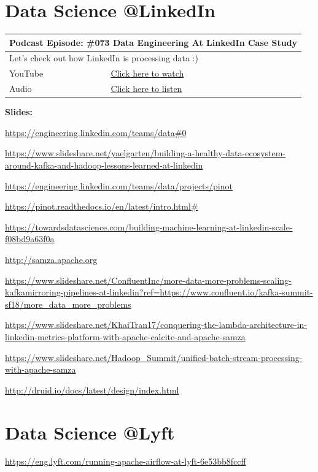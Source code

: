 \documentclass[12pt, numbers=noenddot]{scrreprt} %
\begin{document}
\section{Data Science @LinkedIn}

\begin{table}[h]
\begin{tabular}{ll}
\hline
\multicolumn{2}{l}{\textbf{Podcast Episode:} \#073 Data Engineering At LinkedIn Case Study} \\ \hline
\multicolumn{2}{p{15cm}}{Let's check out how LinkedIn is processing data :)}         \\ \hline
\multicolumn{1}{l|}{YouTube}   & \href{https://youtu.be/wgfoE8Jbr_Q}{Click here to watch}   \\
\multicolumn{1}{l|}{Audio}     & \href{https://anchor.fm/andreaskayy/episodes/073-Data-Engineering-At-LinkedIn-Case-Study-e45is6}{Click here to listen}   \\ \hline
\end{tabular}
\end{table}

\textbf{Slides:}

\url{https://engineering.linkedin.com/teams/data#0}

\url{https://www.slideshare.net/yaelgarten/building-a-healthy-data-ecosystem-around-kafka-and-hadoop-lessons-learned-at-linkedin}

\url{https://engineering.linkedin.com/teams/data/projects/pinot}

\url{https://pinot.readthedocs.io/en/latest/intro.html#}

\url{https://towardsdatascience.com/building-machine-learning-at-linkedin-scale-f08bd9a63f0a}

\url{http://samza.apache.org}

\url{https://www.slideshare.net/ConfluentInc/more-data-more-problems-scaling-kafkamirroring-pipelines-at-linkedin?ref=https://www.confluent.io/kafka-summit-sf18/more_data_more_problems}

\url{https://www.slideshare.net/KhaiTran17/conquering-the-lambda-architecture-in-linkedin-metrics-platform-with-apache-calcite-and-apache-samza}

\url{https://www.slideshare.net/Hadoop_Summit/unified-batch-stream-processing-with-apache-samza}

\url{http://druid.io/docs/latest/design/index.html}

\section{Data Science @Lyft}
\url{https://eng.lyft.com/running-apache-airflow-at-lyft-6e53bb8fccff}
\end{document}
